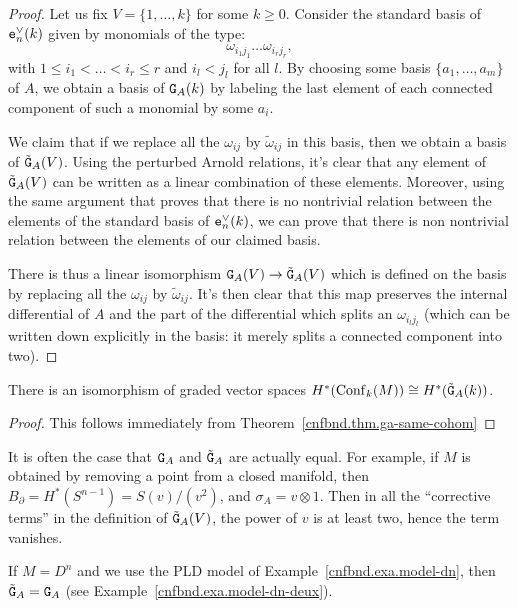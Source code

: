 \begin{proof}
  Let us fix $V = \{ 1, \dots, k \}$ for some $k \geq 0$.
  Consider the standard basis of $\mathtt{e}_{n}^{\vee}(k)$ given by monomials of the type:
  \[ \omega_{i_{1}j_{1}} \dots \omega_{i_{r}j_{r}}, \]
  with $1 \leq i_{1} < \dots < i_{r} \leq r$ and $i_{l} < j_{l}$ for all $l$.
  By choosing some basis $\{ a_{1}, \dots, a_{m} \}$ of $A$, we obtain a basis of $\mathtt{G}_{A}(k)$ by labeling the last element of each connected component of such a monomial by some $a_{i}$.

  We claim that if we replace all the $\omega_{ij}$ by $\tilde\omega_{ij}$ in this basis, then we obtain a basis of $\tilde{\mathtt{G}}_{A}(V)$.
  Using the perturbed Arnold relations, it's clear that any element of $\tilde{\mathtt{G}}_{A}(V)$ can be written as a linear combination of these elements.
  Moreover, using the same argument that proves that there is no nontrivial relation between the elements of the standard basis of $\mathtt{e}_{n}^{\vee}(k)$, we can prove that there is non nontrivial relation between the elements of our claimed basis.

  There is thus a linear isomorphism $\mathtt{G}_{A}(V) \to \tilde{\mathtt{G}}_{A}(V)$ which is defined on the basis by replacing all the $\omega_{ij}$ by $\tilde\omega_{ij}$.
  It's then clear that this map preserves the internal differential of $A$ and the part of the differential which splits an $\omega_{i_{l}j_{l}}$ (which can be written down explicitly in the basis: it merely splits a connected component into two).
\end{proof}

\begin{corollary}
  There is an isomorphism of graded vector spaces $H^{*}(\operatorname{Conf}_{k}(M)) \cong H^{*}(\tilde{\mathtt{G}}_{A}(k))$.
\end{corollary}
\begin{proof}
  This follows immediately from Theorem~\ref{cnfbnd.thm.ga-same-cohom}
\end{proof}

\begin{remark}
  It is often the case that $\mathtt{G}_{A}$ and $\tilde{\mathtt{G}}_{A}$ are actually equal.
  For example, if $M$ is obtained by removing a point from a closed manifold, then $B_{\partial} = H^{*}(S^{n-1}) = S(v)/(v^{2})$, and $\sigma_{A} = v \otimes 1$.
  Then in all the ``corrective terms'' in the definition of $\tilde{\mathtt{G}}_{A}(V)$, the power of $v$ is at least two, hence the term vanishes.
\end{remark}

\begin{example}
  \label{cnfbnd.exa.model-dn-trois}
  If $M = D^{n}$ and we use the PLD model of Example~\ref{cnfbnd.exa.model-dn}, then $\tilde{\mathtt{G}}_{A} = \mathtt{G}_{A}$ (see Example~\ref{cnfbnd.exa.model-dn-deux}).
\end{example}

